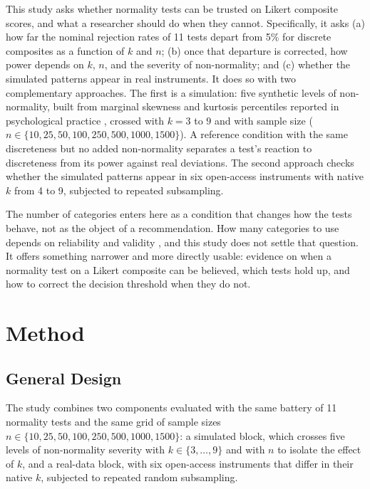 \documentclass[man,mask,donotrepeattitle,floatsintext]{apa7}
\begin{document}
This study asks whether normality tests can be trusted on Likert composite scores, and what a researcher should do when they cannot. Specifically, it asks (a) how far the nominal rejection rates of 11 tests depart from 5\% for discrete composites as a function of $k$ and $n$; (b) once that departure is corrected, how power depends on $k$, $n$, and the severity of non-normality; and (c) whether the simulated patterns appear in real instruments. It does so with two complementary approaches. The first is a simulation: five synthetic levels of non-normality, built from marginal skewness and kurtosis percentiles reported in psychological practice \parencite{cain2017}, crossed with $k=3$ to $9$ and with sample size ($n \in \{10, 25, 50, 100, 250, 500, 1000, 1500\}$). A reference condition with the same discreteness but no added non-normality separates a test's reaction to discreteness from its power against real deviations. The second approach checks whether the simulated patterns appear in six open-access instruments with native $k$ from 4 to 9, subjected to repeated subsampling.

The number of categories enters here as a condition that changes how the tests behave, not as the object of a recommendation. How many categories to use depends on reliability and validity \parencite{lozano2008,preston2000}, and this study does not settle that question. It offers something narrower and more directly usable: evidence on when a normality test on a Likert composite can be believed, which tests hold up, and how to correct the decision threshold when they do not.

\section{Method}
\label{sec:method}

\subsection{General Design}
\label{sec:design}

The study combines two components evaluated with the same battery of 11 normality tests and the same grid of sample sizes $n \in \{10, 25, 50, 100, 250, 500, 1000, 1500\}$: a simulated block, which crosses five levels of non-normality severity with $k \in \{3, \ldots, 9\}$ and with $n$ to isolate the effect of $k$, and a real-data block, with six open-access instruments that differ in their native $k$, subjected to repeated random subsampling.
\end{document}
